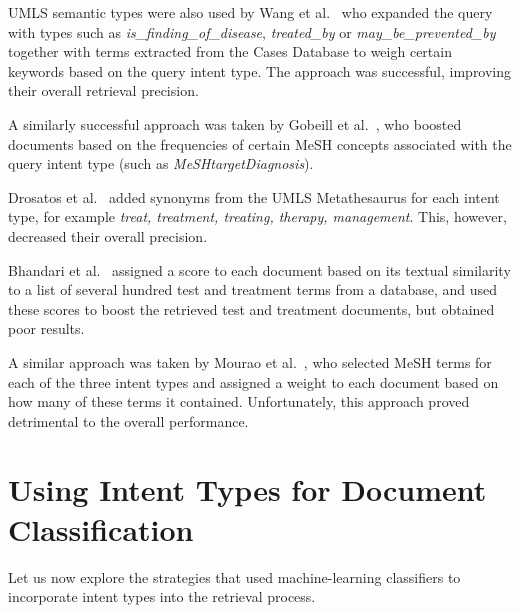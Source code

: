 UMLS semantic types were also used by Wang et al.\ \cite{udel} who expanded the query
with types such as \emph{is\_finding\_of\_disease}, \emph{treated\_by} or
\emph{may\_be\_prevented\_by} together with terms extracted from the Cases Database to weigh certain keywords
based on the query intent type. The approach was successful, improving their overall retrieval precision.

A similarly successful approach was taken by Gobeill et al.\ \cite{bitem}, who boosted documents based on the
frequencies of certain MeSH
concepts associated with the query intent type (such as \emph{MeSHtargetDiagnosis}).

Drosatos et al.\ \cite{duth} added synonyms from the UMLS Metathesaurus for each intent type, for example
\emph{treat, treatment, treating, therapy, management}. This, however, decreased their overall precision.

Bhandari et al.\ \cite{ir.cs.sfsu} assigned a score to each document based on
its textual similarity to a list of several hundred test and treatment terms from a database,
and used these scores to boost the retrieved test and treatment documents, but obtained poor results.

A similar approach was taken by Mourao et al.\ \cite{novasearch}, who selected MeSH
terms for each of the three intent types and assigned a weight to each
document based on how many of these terms it contained. Unfortunately, this approach proved detrimental to
the overall performance.
%

\section{Using Intent Types for Document Classification}
Let us now explore the strategies that used machine-learning classifiers to
incorporate intent types into the retrieval process.

